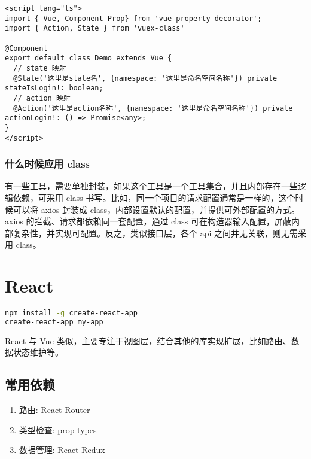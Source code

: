 \begin{lstlisting}
<script lang="ts">
import { Vue, Component Prop} from 'vue-property-decorator';
import { Action, State } from 'vuex-class'

@Component
export default class Demo extends Vue {
  // state 映射
  @State('这里是state名', {namespace: '这里是命名空间名称'}) private stateIsLogin!: boolean;
  // action 映射
  @Action('这里是action名称', {namespace: '这里是命名空间名称'}) private actionLogin!: () => Promise<any>;
}
</script>
\end{lstlisting}

\subsubsection{什么时候应用
class}\label{ux4ec0ux4e48ux65f6ux5019ux5e94ux7528-class}

有一些工具，需要单独封装，如果这个工具是一个工具集合，并且内部存在一些逻辑依赖，可采用
class 书写。比如，同一个项目的请求配置通常是一样的，这个时候可以将 axios
封装成 class，内部设置默认的配置，并提供可外部配置的方式。axios
的拦截、请求都依赖同一套配置，通过 class
可在构造器输入配置，屏蔽内部复杂性，并实现可配置。反之，类似接口层，各个
api 之间并无关联，则无需采用 class。

\section{React}\label{react}

\begin{lstlisting}[language=bash]
npm install -g create-react-app
create-react-app my-app
\end{lstlisting}

\href{https://reactjs.org/}{React} 与 Vue
类似，主要专注于视图层，结合其他的库实现扩展，比如路由、数据状态维护等。

\subsection{常用依赖}\label{ux5e38ux7528ux4f9dux8d56}

\begin{enumerate}
\def\labelenumi{\arabic{enumi}.}
\tightlist
\item
  路由: \href{https://github.com/ReactTraining/react-router}{React
  Router}
\item
  类型检查: \href{https://github.com/facebook/prop-types}{prop-types}
\item
  数据管理: \href{https://github.com/reactjs/react-redux}{React Redux}
\end{enumerate}

